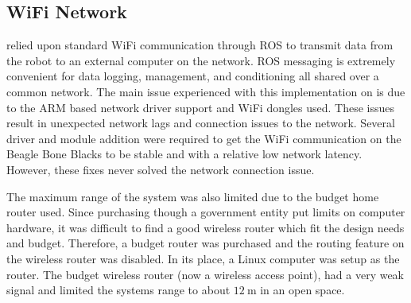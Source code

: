 \begin{appendices}
\subsection{WiFi Network}
\SB{} relied upon standard WiFi communication through ROS to transmit data from the robot to an external computer on the network.
ROS messaging is extremely convenient for data logging, management, and conditioning all shared over a common network.
The main issue experienced with this implementation on \SB{} is due to the ARM based network driver support and WiFi dongles used.
These issues result in unexpected network lags and connection issues to the network.
Several driver and module addition were required to get the WiFi communication on the Beagle Bone Blacks to be stable and with a relative low network latency.
However, these fixes never solved the network connection issue.

The maximum range of the system was also limited due to the budget home router used.
Since purchasing though a government entity put limits on computer hardware, it was difficult to find a good wireless router which fit the design needs and budget.
Therefore, a budget router was purchased and the routing feature on the wireless router was disabled.
In its place, a Linux computer was setup as the router.
The budget wireless router (now a wireless access point), had a very weak signal and limited the systems range to about \(\SI{12}{\meter}\) in an open space.


\end{appendices}
